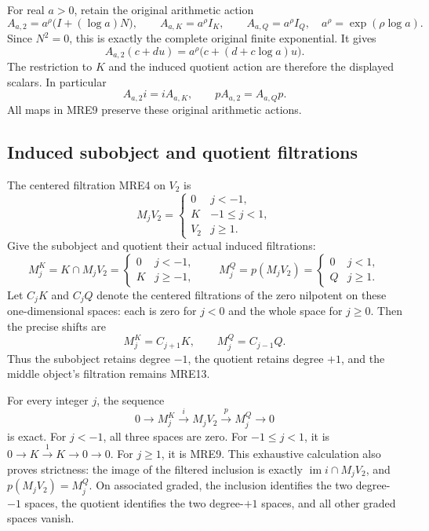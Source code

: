 For real \(a>0\), retain the original arithmetic action
\[
 A_{a,2}=a^\rho\bigl(I+(\log a)N\bigr),\qquad
 A_{a,K}=a^\rho I_K,\qquad A_{a,Q}=a^\rho I_Q,
 \quad a^\rho=\exp(\rho\log a).
 \tag{MRE10}
\]
Since \(N^2=0\), this is exactly the complete original finite exponential.
It gives
\[
 A_{a,2}(c+du)=a^\rho\bigl(c+(d+c\log a)u\bigr).
 \tag{MRE11}
\]
The restriction to \(K\) and the induced quotient action are therefore
the displayed scalars. In particular
\[
 A_{a,2}i=iA_{a,K},\qquad pA_{a,2}=A_{a,Q}p.
 \tag{MRE12}
\]
All maps in MRE9 preserve these original arithmetic actions.

\subsection{Induced subobject and quotient filtrations}

The centered filtration MRE4 on \(V_2\) is
\[
 M_jV_2=
 \begin{cases}
 0&j<-1,\\
 K&-1\leq j<1,\\
 V_2&j\geq1.
 \end{cases}
 \tag{MRE13}
\]
Give the subobject and quotient their actual induced filtrations:
\[
 M_j^K=K\cap M_jV_2=
 \begin{cases}0&j<-1,\\K&j\geq-1,\end{cases}
 \qquad
 M_j^Q=p(M_jV_2)=
 \begin{cases}0&j<1,\\Q&j\geq1.\end{cases}
 \tag{MRE14}
\]
Let \(C_jK\) and \(C_jQ\) denote the centered filtrations of the zero
nilpotent on these one-dimensional spaces: each is zero for \(j<0\)
and the whole space for \(j\geq0\). Then the precise shifts are
\[
 M_j^K=C_{j+1}K,\qquad M_j^Q=C_{j-1}Q.
 \tag{MRE15}
\]
Thus the subobject retains degree \(-1\), the quotient retains degree
\(+1\), and the middle object's filtration remains MRE13.

For every integer \(j\), the sequence
\[
 0\longrightarrow M_j^K\xrightarrow{i}M_jV_2
     \xrightarrow{p}M_j^Q\longrightarrow0
 \tag{MRE16}
\]
is exact. For \(j<-1\), all three spaces are zero. For
\(-1\leq j<1\), it is \(0\to K\xrightarrow{1}K\to0\to0\).
For \(j\geq1\), it is MRE9. This exhaustive calculation also proves
strictness: the image of the filtered inclusion is exactly
\(\operatorname{im}i\cap M_jV_2\), and \(p(M_jV_2)=M_j^Q\).
On associated graded, the inclusion identifies the two degree-\(-1\)
spaces, the quotient identifies the two degree-\(+1\) spaces, and all
other graded spaces vanish.

